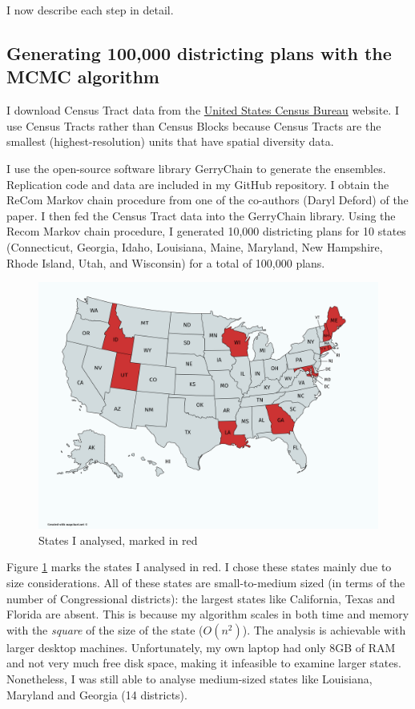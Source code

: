 \documentclass[]{article}
\begin{document}
I now describe each step in detail.

\hypertarget{generating-100000-districting-plans-with-the-mcmc-algorithm}{%
\subsection{Generating 100,000 districting plans with the MCMC
algorithm}\label{generating-100000-districting-plans-with-the-mcmc-algorithm}}

I download Census Tract data from the \href{census.gov}{United States
Census Bureau} website. I use Census Tracts rather than Census Blocks
because Census Tracts are the smallest (highest-resolution) units that
have spatial diversity data.

I use the open-source software library GerryChain to generate the
ensembles. Replication code and data are included in my GitHub
repository. I obtain the ReCom Markov chain procedure from one of the
co-authors (Daryl Deford) of the \cite{ddj2019recom} paper. I then fed
the Census Tract data into the GerryChain library. Using the Recom
Markov chain procedure, I generated 10,000 districting plans for 10
states (Connecticut, Georgia, Idaho, Louisiana, Maine, Maryland, New
Hampshire, Rhode Island, Utah, and Wisconsin) for a total of 100,000
plans.

\begin{figure}
\centering
\includegraphics{./img/states_analysed.png}
\caption{States I analysed, marked in red \label{states_analysed}}
\end{figure}

Figure \ref{states_analysed} marks the states I analysed in red. I chose
these states mainly due to size considerations. All of these states are
small-to-medium sized (in terms of the number of Congressional
districts): the largest states like California, Texas and Florida are
absent. This is because my algorithm scales in both time and memory with
the \emph{square} of the size of the state (\(O(n^2)\)). The analysis is
achievable with larger desktop machines. Unfortunately, my own laptop
had only 8GB of RAM and not very much free disk space, making it
infeasible to examine larger states. Nonetheless, I was still able to
analyse medium-sized states like Louisiana, Maryland and Georgia (14
districts).
\end{document}
